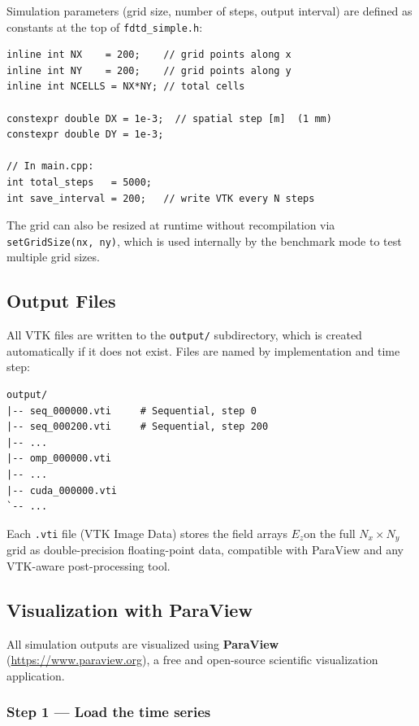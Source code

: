 \documentclass[12pt,a4paper]{article}
\begin{document}
Simulation parameters (grid size, number of steps, output interval)
are defined as constants at the top of \texttt{fdtd\_simple.h}:

\begin{verbatim}
inline int NX    = 200;    // grid points along x
inline int NY    = 200;    // grid points along y
inline int NCELLS = NX*NY; // total cells

constexpr double DX = 1e-3;  // spatial step [m]  (1 mm)
constexpr double DY = 1e-3;

// In main.cpp:
int total_steps   = 5000;
int save_interval = 200;   // write VTK every N steps
\end{verbatim}

The grid can also be resized at runtime without recompilation via
\texttt{setGridSize(nx, ny)}, which is used internally by the
benchmark mode to test multiple grid sizes.

\subsection{Output Files}

All VTK files are written to the \texttt{output/} subdirectory,
which is created automatically if it does not exist.
Files are named by implementation and time step:

\begin{verbatim}
output/
|-- seq_000000.vti     # Sequential, step 0
|-- seq_000200.vti     # Sequential, step 200
|-- ...
|-- omp_000000.vti
|-- ...
|-- cuda_000000.vti
`-- ...
\end{verbatim}

Each \texttt{.vti} file (VTK Image Data) stores the field
arrays $E_z$on the full $N_x \times N_y$ grid as
double-precision floating-point data, compatible with ParaView and
any VTK-aware post-processing tool.

\subsection{Visualization with ParaView}

All simulation outputs are visualized using
\textbf{ParaView} (\url{https://www.paraview.org}), a free and
open-source scientific visualization application.

\subsubsection*{Step 1 — Load the time series}
\end{document}
